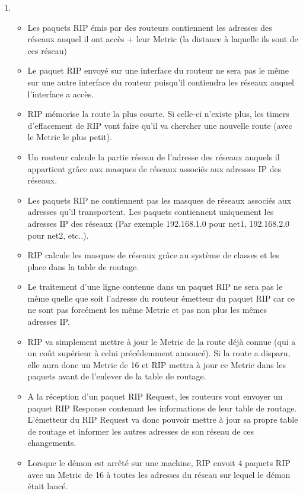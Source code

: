 \documentclass{article}
\begin{document}
\begin{enumerate}
\item 
	\begin{itemize}\renewcommand{\labelitemi}{$\bullet$}
	\item Les paquets RIP émis par des routeurs contiennent les adresses des réseaux auquel il ont accès + leur Metric (la distance à laquelle ils sont de ces réseau)
	\item Le paquet RIP envoyé sur une interface du routeur ne sera pas le même sur une autre interface du routeur puisqu'il contiendra les réseaux auquel l'interface a accès.
	\item RIP mémorise la route la plus courte. Si celle-ci n'existe plus, les timers d'effacement de RIP vont faire qu'il va chercher une nouvelle route (avec le Metric le plus petit).
	\item Un routeur calcule la partie réseau de l'adresse des réseaux auquels il appartient grâce aux masques de réseaux associés aux adresses IP des réseaux.
	\item Les paquets RIP ne contiennent pas les masques de réseaux associés aux adresses qu'il transportent. Les paquets contiennent uniquement les adresses IP des réseaux (Par exemple 192.168.1.0 pour net1, 192.168.2.0 pour net2, etc..).
	\item RIP calcule les masques de réseaux grâce au système de classes et les place dans la table de routage.
	\item Le traitement d'une ligne contenue dans un paquet RIP ne sera pas le même quelle que soit l'adresse du routeur émetteur du paquet RIP car ce ne sont pas forcément les même Metric et pas non plus les mêmes adresses IP.
	\item RIP va simplement mettre à jour le Metric de la route déjà connue (qui a un coût supérieur à celui précédemment annoncé). Si la route a disparu, elle aura donc un Metric de 16 et RIP mettra à jour ce Metric dans les paquets avant de l'enlever de la table de routage.
	\item A la réception d'un paquet RIP Request, les routeurs vont envoyer un paquet RIP Response contenant les informations de leur table de routage. L'émetteur du RIP Request va donc pouvoir mettre à jour sa propre table de routage et informer les autres adresses de son réseau de ces changements.
	\item Lorsque le démon est arrêté sur une machine, RIP envoit 4 paquets RIP avec un Metric de 16 à toutes les adresses du réseau sur lequel le démon était lancé.\\
\end{itemize}


\end{enumerate}
\end{document}
